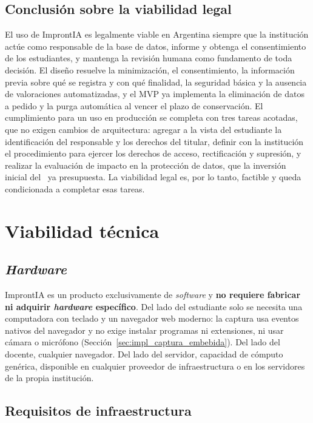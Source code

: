 \subsection{Conclusión sobre la viabilidad legal}

El uso de ImprontIA es legalmente viable en Argentina siempre que la institución actúe como responsable de la base de datos, informe y obtenga el consentimiento de los estudiantes, y mantenga la revisión humana como fundamento de toda decisión. El diseño resuelve la minimización, el consentimiento, la información previa sobre qué se registra y con qué finalidad, la seguridad básica y la ausencia de valoraciones automatizadas, y el MVP ya implementa la eliminación de datos a pedido y la purga automática al vencer el plazo de conservación. El cumplimiento para un uso en producción se completa con tres tareas acotadas, que no exigen cambios de arquitectura: agregar a la vista del estudiante la identificación del responsable y los derechos del titular, definir con la institución el procedimiento para ejercer los derechos de acceso, rectificación y supresión, y realizar la evaluación de impacto en la protección de datos, que la inversión inicial del \ ya presupuesta. La viabilidad legal es, por lo tanto, factible y queda condicionada a completar esas tareas.

\section{Viabilidad técnica}
\label{sec:viab_tecnica}

\subsection{\textit{Hardware}}

ImprontIA es un producto exclusivamente de \textit{software} y \textbf{no requiere fabricar ni adquirir \textit{hardware} específico}. Del lado del estudiante solo se necesita una computadora con teclado y un navegador web moderno: la captura usa eventos nativos del navegador y no exige instalar programas ni extensiones, ni usar cámara o micrófono (Sección~\ref{sec:impl_captura_embebida}). Del lado del docente, cualquier navegador. Del lado del servidor, capacidad de cómputo genérica, disponible en cualquier proveedor de infraestructura o en los servidores de la propia institución.

\subsection{Requisitos de infraestructura}

